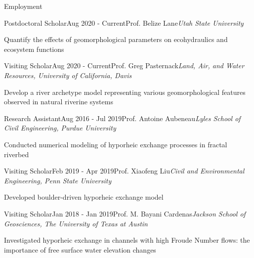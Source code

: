 \documentclass{resume_anzy} %
\begin{document}

\begin{rSection}{Employment}


\begin{rSubsection}{Postdoctoral Scholar}{Aug 2020 - Current}{Prof. Belize Lane}{\textit{Utah State University}}
\item  Quantify the effects of geomorphological parameters on ecohydraulics and ecosystem functions
\end{rSubsection}

\vspace{-2.5mm}
\begin{rSubsection}{Visiting Scholar}{Aug 2020 - Current}{Prof. Greg Pasternack}{\textit{Land, Air, and Water Resources, University of California, Davis}}
\item  Develop a river archetype model representing various geomorphological features observed in natural riverine systems
\end{rSubsection}

\vspace{-2.5mm}
\begin{rSubsection}{Research Assistant}{Aug 2016 - Jul 2019}{Prof. Antoine Aubeneau}{\textit{Lyles School of Civil Engineering, Purdue University}}
\item Conducted numerical modeling of hyporheic exchange processes in fractal riverbed
\end{rSubsection}


\vspace{-2.5mm}
\begin{rSubsection}{Visiting Scholar}{Feb 2019 - Apr 2019}{Prof. Xiaofeng Liu}{\textit{Civil and Environmental Engineering, Penn State University}}
\item Developed boulder-driven hyporheic exchange model
\end{rSubsection}

\vspace{-2.5mm}
\begin{rSubsection}{Visiting Scholar}{Jan 2018 - Jan 2019}{Prof. M. Bayani Cardenas}{\textit{Jackson School of Geosciences, The University of Texas at Austin}}
\item  Investigated hyporheic exchange in channels with high Froude Number flows: the importance of free surface water elevation changes
\end{rSubsection}


\end{rSection}
\end{document}
